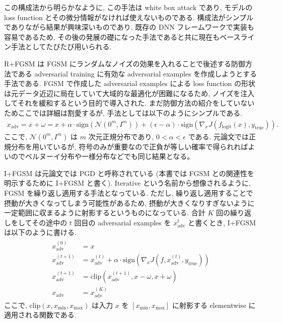 この構成法から明らかなように, この手法は white box attack であり, モデルの loss function とその微分情報がなければ使えないものである.
構成法がシンプルでありながら結果が興味深いものであり, 既存の DNN フレームワークで実装も容易であるため, その後の発展の礎になった手法であると共に現在もベースライン手法としてたびたび用いられる.

R+FGSM は FGSM にランダムなノイズの効果を入れることで後述する防御方法である adversarial training に有効な adversarial examples を作成しようとする手法である.
FGSM で作成した adversarial examples による loss function の形状は元データ近辺に局在していて大域的な最適化が困難になるため, ノイズを注入してそれを緩和するという目的で導入された.
まだ防御方法の紹介をしていないためここでは詳細は割愛するが, 手法としては以下のようにシンプルである.
%
\begin{eqnarray}
x_{\text{adv}} = x + \omega  = x + \alpha \cdot \text{sign} (\mathcal{N} (0^{m}, I^{m})) + (\epsilon - \alpha) \cdot \text{sign} (\nabla_x J (f_{\text{logit}}(x), y_{\text{true}})).
\label{eq:rfgsm}
\end{eqnarray}
%
ここで, $\mathcal{N} (0^{m}, I^{m})$ は $m$ 次元正規分布であり, $0 < \alpha < \epsilon$ である.
元論文では正規分布を用いているが, 符号のみが重要なので正負が等しい確率で得られればよいのでベルヌーイ分布や一様分布などでも同じ結果となる。

I+FGSM は元論文では PGD と呼称されている (本書では FGSM との関連性を明示するために I+FGSM と書く).
Iterative という名前から想像されるように, FGSM を繰り返し適用する手法となっている.
ただし, 繰り返し適用することで摂動が大きくなってしまう可能性があるため, 摂動が大きくなりすぎないように一定範囲に収まるように射影するというものになっている.
合計 $K$ 回の繰り返しをしてその途中の $t$ 回目の adversarial examples を $x_{\text{adv}}^t$ と書くとき, I+FGSM は以下のように書ける.
%
\begin{eqnarray}
\begin{aligned}
x_{\text{adv}}^{(0)} &= x \\
x_{\text{adv}}^{(t + 1)} &= x_{\text{adv}}^{(t)} + \alpha \cdot \text{sign} (\nabla_x J (f, x_{\text{adv}}^{(t)}, y_{\text{true}})) \\
x_{\text{adv}}^{(t + 1)} &= \text{clip} (x_{\text{adv}}^{(t + 1)}, x - \omega, x + \omega) \\
x_{\text{adv}} &= x_{\text{adv}}^{(K)}
\end{aligned}
\label{eq:ifgsm}
\end{eqnarray}
%
ここで, $\text{clip} (x, x_{\text{min}}, x_{\text{max}})$ は入力 $x$ を $[x_{\text{min}}, x_{\text{max}}]$ に射影する elementwise に適用される関数である.

